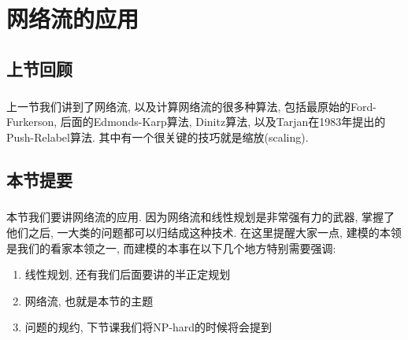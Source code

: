 %
\chapter{网络流的应用}


%
    \section{上节回顾}
        \paragraph{}上一节我们讲到了网络流, 以及计算网络流的很多种算法, 包括最原始的Ford-Furkerson, 后面的Edmonds-Karp算法, Dinitz算法, 以及Tarjan在1983年提出的Push-Relabel算法. 其中有一个很关键的技巧就是缩放(scaling). 
    \section{本节提要}
        \paragraph{}本节我们要讲网络流的应用. 因为网络流和线性规划是非常强有力的武器, 掌握了他们之后, 一大类的问题都可以归结成这种技术. 在这里提醒大家一点, 建模的本领是我们的看家本领之一, 而建模的本事在以下几个地方特别需要强调: 
        \begin{enumerate}
        \item 线性规划, 还有我们后面要讲的半正定规划
        \item 网络流, 也就是本节的主题
        \item 问题的规约, 下节课我们将NP-hard的时候将会提到
        \end{enumerate}

